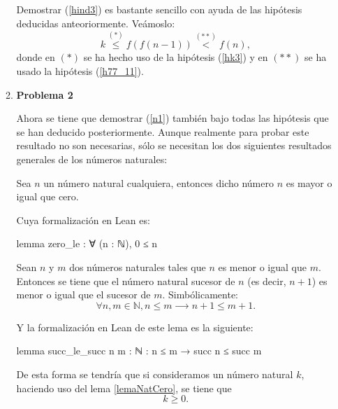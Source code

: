\begin{demostracion}
\begin{itemize}
\begin{enumerate}
        Demostrar (\ref{hind3}) es bastante sencillo con ayuda de
        las hipótesis deducidas anteoriormente. Veámoslo:
        \begin{equation}
          k\stackrel{(*)}{≤}f(f(n-1))\stackrel{(**)}{<}f(n),
        \end{equation}
        donde en \((*)\) se ha hecho uso de la hipótesis (\ref{hk3})
        y en \((**)\) se ha usado la hipótesis (\ref{h77_11}).

      \item \textbf{Problema 2}

        Ahora se tiene que demostrar (\ref{n1}) también bajo todas
        las hipótesis que se han deducido posteriormente. Aunque
        realmente para probar este resultado no son necesarias,
        sólo se necesitan los dos siguientes resultados generales
        de los números naturales:

        \begin{lema}\label{lemaNatCero}
          Sea \(n\) un número natural cualquiera, entonces dicho
          número \(n\) es mayor o igual que cero.
        \end{lema}

        Cuya formalización en Lean es:
        \begin{leancode}
          lemma zero_le : ∀ (n : ℕ), 0 ≤ n
        \end{leancode}

        \begin{lema}\label{lemaNatSuc}
          Sean \(n\) y \(m\) dos números naturales tales que \(n\)
          es menor o igual que \(m\). Entonces se tiene que el
          número natural sucesor de \(n\) (es decir, \(n+1\)) es
          menor o igual que el sucesor de \(m\). Simbólicamente:
          \begin{equation}
            ∀n, m ∈ ℕ, n ≤ m ⟶ n+1 ≤ m+1.
          \end{equation}
        \end{lema}

        Y la formalización en Lean de este lema es la siguiente:
        \begin{leancode}
          lemma succ_le_succ {n m : ℕ} : n ≤ m → succ n ≤ succ m
        \end{leancode}

        De esta forma se tendría que si consideramos un número
        natural \(k\), haciendo uso del lema \ref{lemaNatCero}, se
        tiene que
        \begin{equation}\label{k0}
          k ≥ 0.
        \end{equation}


\end{enumerate}
\end{itemize}
\end{demostracion}
